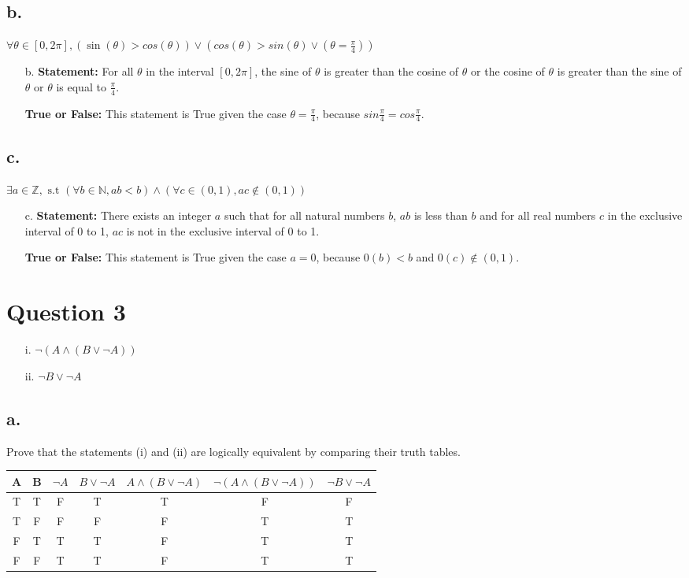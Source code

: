 \documentclass{article}
\begin{document}
    \subsection*{b.} $\forall \theta \in [0, 2\pi], (\sin(\theta) > cos(\theta)) \lor (cos(\theta) > sin(\theta) \lor (\theta = \frac{\pi}{4}))$
\begin{itemize}
    \item[b.] \textbf{Statement: } For all $\theta$ in the interval $[0, 2\pi]$, the sine of $\theta$ is greater than the cosine of $\theta$ or the cosine of $\theta$ is greater than the sine of $\theta$ or $\theta$ is equal to $\frac{\pi}{4}$.
    \item[] \textbf{True or False: } This statement is True given the case $\theta = \frac{\pi}{4}$, because $sin{\frac{\pi}{4}} = cos{\frac{\pi}{4}}$.
    \item[] 
\end{itemize}
\subsection*{c.} $\exists a \in \mathbb{Z}, \text{ s.t } (\forall b \in \mathbb{N},ab < b) \land (\forall c \in (0,1), ac \notin (0,1))$
\begin{itemize}
    \item[c.] \textbf{Statement: } There exists an integer $a$ such that for all natural numbers $b$, $ab$ is less than $b$ and for all real numbers $c$ in the exclusive interval of 0 to 1, $ac$ is not in the exclusive interval of 0 to 1. 
    \item[] \textbf{True or False: } This statement is True given the case $a = 0$, because $0(b) < b$ and $0(c) \notin (0,1)$.
\end{itemize}

\section*{Question 3}
\begin{itemize}
    \item[i.] $\lnot(A \land (B \lor \lnot A))$
    \item[ii.] $\lnot B \lor \lnot A$
\end{itemize}
\subsection*{a.} Prove that the statements (i) and (ii) are logically equivalent by comparing their truth tables.
\begin{table}[H]
\centering
\begin{tabular}{|c|c|c|c|c|c|c|}
\hline
A & B & $\lnot A$ & $B \lor \lnot A$ & $A \land (B \lor \lnot A)$ & $\lnot(A \land (B \lor \lnot A))$ & $\lnot B \lor \lnot A$ \\ \hline
T & T & F & T & T & F & F \\ \hline
T & F & F & F & F & T & T \\ \hline
F & T & T & T & F & T & T \\ \hline
F & F & T & T & F & T & T \\ \hline    
\end{tabular}
\end{table}
\end{document}
